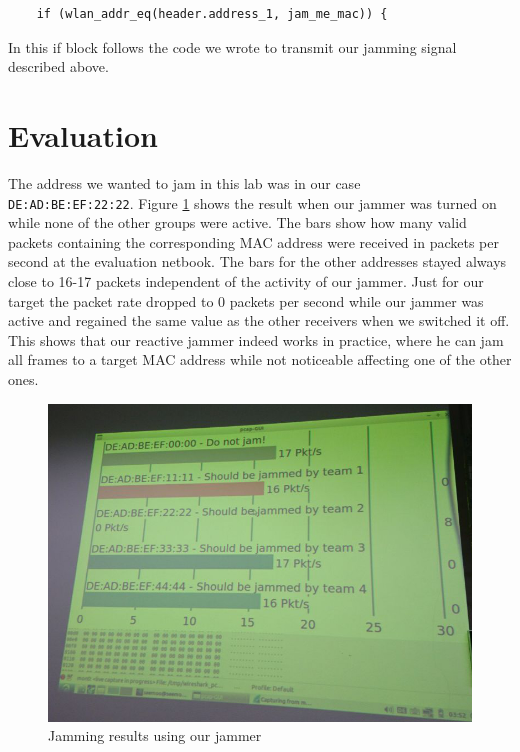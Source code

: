 \documentclass[sigconf]{acmart}
\begin{document}
\begin{verbatim}
	if (wlan_addr_eq(header.address_1, jam_me_mac)) {
\end{verbatim}

In this if block follows the code we wrote to transmit our jamming signal described above. 



\section{Evaluation}
The address we wanted to jam in this lab was in our case \\\texttt{DE:AD:BE:EF:22:22}. Figure \ref{fig:jammings_result}
shows the result when our jammer was turned on while none of the other groups were active. The bars show how many
valid packets containing the corresponding MAC address were received in packets per second at the evaluation netbook. 
The bars for the other addresses stayed always close to 16-17 packets independent of the activity of our jammer. Just
for our target the packet rate dropped to 0 packets per second while our jammer was active and regained the same
value as the other receivers when we switched it off. This shows that our reactive jammer indeed works in practice, where
he can jam all frames to a target MAC address while not noticeable affecting one of the other ones.


\begin{figure}[tb!]
	\hfill
	\includegraphics[width=1\linewidth]{jamming_result.jpg}
	\caption{Jamming results using our jammer}
	\label{fig:jammings_result}
\end{figure}
\end{document}
